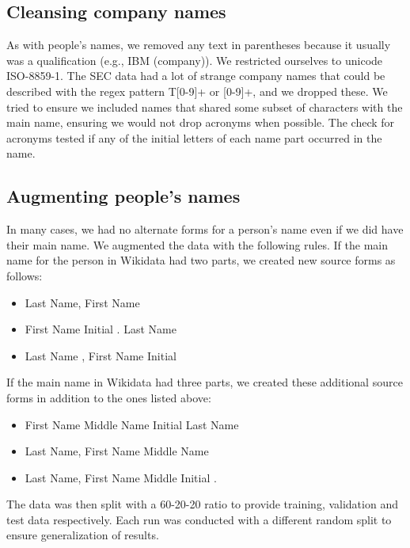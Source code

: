 \subsection{Cleansing company names}
As with people's names, we removed any text in parentheses because it usually was a qualification (e.g., IBM (company)).  We restricted ourselves to unicode ISO-8859-1.  The SEC data had a lot of strange company names that could be described with the regex pattern T[0-9]+ or [0-9]+, and we dropped these.  We tried to ensure we included names that shared some subset of characters with the main name, ensuring we would not drop acronyms when possible.  The check for acronyms tested if any of the initial letters of each name part occurred in the name.

\subsection{Augmenting people's names}
In many cases, we had no alternate forms for a person's name even if we did have their main name.  We augmented the data with the following rules.  If the main name for the person in Wikidata had two parts, we created new source forms as follows: 
\begin{itemize}
\item Last Name, First Name
\item First Name Initial . Last Name
\item Last Name , First Name Initial
\end{itemize}
If the main name in Wikidata had three parts, we created these additional source forms in addition to the ones listed above:
\begin{itemize}
\item First Name Middle Name Initial Last Name
\item Last Name, First Name Middle Name
\item Last Name, First Name Middle Initial .
\end{itemize}
   
The data was then split with a 60-20-20 ratio to provide training, validation and test data respectively.  Each run was conducted with a different random split to ensure generalization of results.
